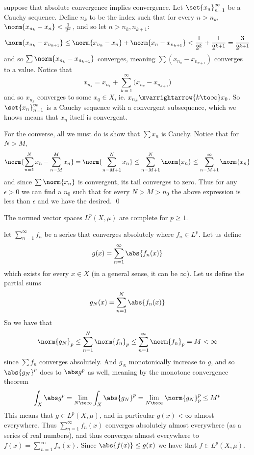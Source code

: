 \elemm

\Proof suppose that absolute convergence implies convergence.
Let $\set{x_n}_{n=1}^\infty$ be a Cauchy sequence.
Define $n_k$ to be the index such that for every $n>n_k$, $\norm{x_{n_k}-x_n}<\frac1{2^k}$, and so let $n>n_k,n_{k+1}$:
$$ \norm{x_{n_k} - x_{n_{k+1}}} \leq \norm{x_{n_k} - x_n} + \norm{x_n - x_{n_{k+1}}} < \frac1{2^k} + \frac1{2^{k+1}} = \frac3{2^{k+1}} $$
and so $\sum\norm{x_{n_k}-x_{n_{k+1}}}$ converges, meaning $\sum(x_{n_k}-x_{n_{k+1}})$ converges to a value.
Notice that
$$ x_{n_k} = x_{n_1} + \sum_{k=1}^\infty\bigl(x_{n_k} - x_{n_{k+1}}\bigr) $$
and so $x_{n_k}$ converges to some $x_0\in X$, ie. $x_{n_k}\xvarrightarrow{k\to\infty}x_0$.
So $\set{x_n}_{n=1}^\infty$ is a Cauchy sequence with a convergent subsequence, which we knows means that $x_n$ itself is convergent.

For the converse, all we must do is show that $\sum x_n$ is Cauchy.
Notice that for $N>M$,
$$ \norm{\sum_{n=1}^N x_n - \sum_{n=M}^M x_n} = \norm{\sum_{n=M+1}^Nx_n} \leq \sum_{n=M+1}^N\norm{x_n} \leq \sum_{n=M+1}^\infty\norm{x_n} $$
and since $\sum\norm{x_n}$ is convergent, its tail converges to zero.
Thus for any $\epsilon>0$ we can find a $n_0$ such that for every $N>M>n_0$ the above expression is less than $\epsilon$ and we have the desired.
\qed

\bthrm

    The normed vector spaces $L^p(X,\mu)$ are complete for $p\geq1$.

\ethrm

\Proof let $\sum_{n=1}^\infty f_n$ be a series that converges absolutely where $f_n\in L^p$.
Let us define
$$ g(x) = \sum_{n=1}^\infty\abs{f_n(x)} $$
which exists for every $x\in X$ (in a general sense, it can be $\infty$).
Let us define the partial sums
$$ g_N(x) = \sum_{n=1}^N\abs{f_n(x)} $$
So we have that
$$ \norm{g_N}_p \leq \sum_{n=1}^N\norm{f_n}_p \leq \sum_{n=1}^\infty\norm{f_n}_p = M < \infty $$
since $\sum f_n$ converges absolutely.
And $g_N$ monotonically increase to $g$, and so $\abs{g_N}^p$ does to $\abs g^p$ as well, meaning by the monotone convergence theorem
$$ \int_X\abs g^p = \lim_{N\to\infty}\int_X\abs{g_N}^p = \lim_{N\to\infty}\norm{g_N}_p^p \leq M^p $$
This means that $g\in L^p(X,\mu)$, and in particular $g(x)<\infty$ almost everywhere.
Thus $\sum_{n=1}^\infty f_n(x)$ converges absolutely almost everywhere (as a series of real numbers), and thus converges almost everywhere to $f(x)=\sum_{n=1}^\infty f_n(x)$.
Since $\abs{f(x)}\leq g(x)$ we have that $f\in L^p(X,\mu)$.

